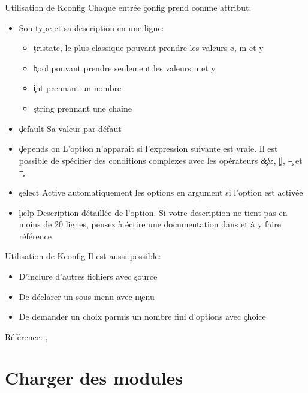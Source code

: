 \begin{frame}[fragile=singleslide]{Utilisation de Kconfig}
  Chaque entrée \c{config} prend comme attribut:
  \begin{itemize} 
  \item Son type et sa description en une ligne:
    \begin{itemize}
    \item \c{tristate}, le plus  classique pouvant prendre les valeurs
     ø, m et y
    \item \c{bool} pouvant prendre seulement les valeurs n et y
    \item \c{int} prennant un nombre
    \item \c{string} prennant une chaîne
    \end{itemize} 
  \item \c{default} Sa valeur par défaut
  \item  \c{depends on} L'option  n'apparait si  l'expression suivante
    est vraie.  Il est possible de spécifier  des conditions complexes
    avec les opérateurs \c{&&}, \c{||}, \c{=} et \c{\!=}
  \item \c{select}  Active automatiquement les options  en argument si
    l'option est activée
  \item   \c{help}  Description   détaillée  de   l'option.   Si  votre
    description ne  tient pas en moins  de 20 lignes,  pensez à écrire
    une documentation dans  et à y faire référence
  \end{itemize} 
\end{frame}

\begin{frame}[fragile=singleslide]{Utilisation de Kconfig}
  Il est aussi possible:
  \begin{itemize} 
  \item D'inclure d'autres fichiers avec \c{source}
  \item De déclarer un sous menu avec \c{menu}
  \item  De demander  un choix  parmis un  nombre fini  d'options avec
    \c{choice}
  \end{itemize} 
  Référence:                 ,
\end{frame}

\section{Charger des modules}

